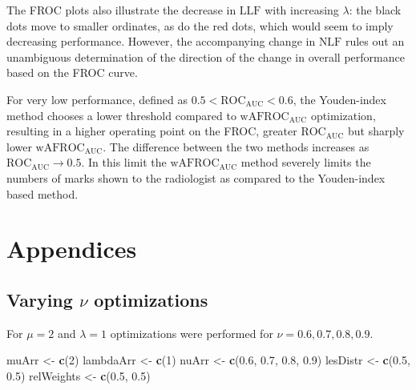 \documentclass[
]{book}
\newenvironment{Shaded}{\begin{snugshade}}{\end{snugshade}}
\newcommand{\DecValTok}[1]{\textcolor[rgb]{0.00,0.00,0.81}{#1}}
\newcommand{\FloatTok}[1]{\textcolor[rgb]{0.00,0.00,0.81}{#1}}
\newcommand{\KeywordTok}[1]{\textcolor[rgb]{0.13,0.29,0.53}{\textbf{#1}}}
\newcommand{\NormalTok}[1]{#1}
\newcommand{\StringTok}[1]{\textcolor[rgb]{0.31,0.60,0.02}{#1}}
\begin{document}
The FROC plots also illustrate the decrease in \(\text{LLF}\) with increasing \(\lambda\): the black dots move to smaller ordinates, as do the red dots, which would seem to imply decreasing performance. However, the accompanying change in \(\text{NLF}\) rules out an unambiguous determination of the direction of the change in overall performance based on the FROC curve.

For very low performance, defined as \(0.5 < \text{ROC}_\text{AUC} < 0.6\), the Youden-index method chooses a lower threshold compared to \(\text{wAFROC}_\text{AUC}\) optimization, resulting in a higher operating point on the FROC, greater \(\text{ROC}_\text{AUC}\) but sharply lower \(\text{wAFROC}_\text{AUC}\). The difference between the two methods increases as \(\text{ROC}_\text{AUC} \rightarrow 0.5\). In this limit the \(\text{wAFROC}_\text{AUC}\) method severely limits the numbers of marks shown to the radiologist as compared to the Youden-index based method.

\hypertarget{cad-optim-op-appendices}{%
\section{Appendices}\label{cad-optim-op-appendices}}

\hypertarget{optim-op-point-vary-nu}{%
\subsection{\texorpdfstring{Varying \(\nu\) optimizations}{Varying \textbackslash nu optimizations}}\label{optim-op-point-vary-nu}}

For \(\mu = 2\) and \(\lambda = 1\) optimizations were performed for \(\nu = 0.6, 0.7, 0.8, 0.9\).

\begin{Shaded}
\begin{Highlighting}[]
\NormalTok{muArr <-}\StringTok{ }\KeywordTok{c}\NormalTok{(}\DecValTok{2}\NormalTok{)}
\NormalTok{lambdaArr <-}\StringTok{ }\KeywordTok{c}\NormalTok{(}\DecValTok{1}\NormalTok{)}
\NormalTok{nuArr <-}\StringTok{ }\KeywordTok{c}\NormalTok{(}\FloatTok{0.6}\NormalTok{, }\FloatTok{0.7}\NormalTok{, }\FloatTok{0.8}\NormalTok{, }\FloatTok{0.9}\NormalTok{)}
\NormalTok{lesDistr <-}\StringTok{ }\KeywordTok{c}\NormalTok{(}\FloatTok{0.5}\NormalTok{, }\FloatTok{0.5}\NormalTok{)}
\NormalTok{relWeights <-}\StringTok{ }\KeywordTok{c}\NormalTok{(}\FloatTok{0.5}\NormalTok{, }\FloatTok{0.5}\NormalTok{)}
\end{Highlighting}
\end{Shaded}
\end{document}
